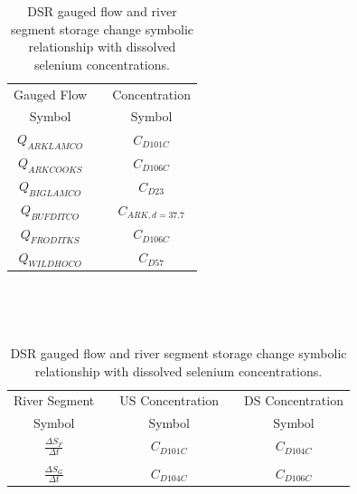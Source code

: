 \begin{linenumbers}
\begin{table}[htbp]
	\centering
	\caption[DSR gauged flow and river segment storage change symbolic relationship with dissolved selenium concentrations. ]{DSR gauged flow and river segment storage change symbolic relationship with dissolved selenium concentrations.}
	\label{tab:concFlowStoreRelationship_DSR}
	\begin{subtable}{\textwidth}
		\centering
		\begin{tabular}{c c c} 
			\toprule  
			Gauged Flow & & Concentration \\
			Symbol & & Symbol\\
			\toprule 
			$ Q_{ARKLAMCO} $ & & $ C_{D101C} $\\
			$ Q_{ARKCOOKS} $ & & $ C_{D106C} $\\
			$ Q_{BIGLAMCO} $ & & $ C_{D23} $\\
			$ Q_{BUFDITCO} $ & & $ C_{ARK,d=37.7} $\\
			$ Q_{FRODITKS} $ & & $ C_{D106C} $\\
			$ Q_{WILDHOCO} $ & & $ C_{D57} $\\
			\bottomrule
		\end{tabular} \\
	\end{subtable}\\
	\tablevspace
	\begin{subtable}{\textwidth}
		\centering
		\begin{tabular}{c c c c c} 
			\toprule  
			River Segment & & US Concentration & & DS Concentration\\
			Symbol & & Symbol & & Symbol\\
			\toprule 
			$ \displaystyle \frac{\Delta S_F}{\Delta t} $ & & $ C_{D101C} $ & & $ C_{D104C} $\\ \\
			$ \displaystyle \frac{\Delta S_G}{\Delta t} $ & & $ C_{D104C} $ & & $ C_{D106C} $\\
			\bottomrule
		\end{tabular} \\
	\end{subtable}\\
\end{table}


\end{linenumbers}
